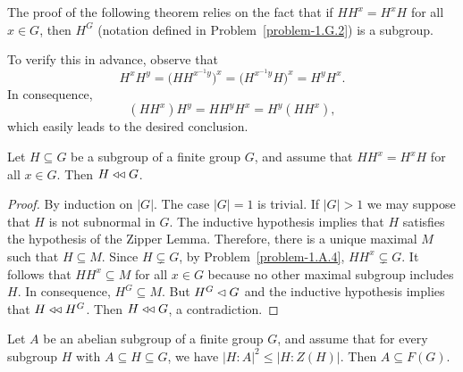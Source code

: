 \begin{rem}
    The proof of the following theorem relies on the fact that if $HH^x=H^xH$ for all $x\in G$, then $H^G$ (notation defined in {\upshape Problem~\ref{problem-1.G.2}}) is a subgroup.
    
    To verify this in advance, observe that
    $$
        H^xH^y = \Big(HH^{x^{-1}y}\Big)^x = \Big(H^{x^{-1}y}H\Big)^x = H^yH^x.
    $$
    In consequence,
    $$
        (HH^x)H^y = HH^yH^x = H^y(HH^x),
    $$
    which easily leads to the desired conclusion.
\end{rem}

\begin{thm}\label{conjugate-commutativity}
   Let\/ $H \subseteq G$ be a subgroup of a finite group\/ $G$, and assume that\/ $HH^x = H^xH$ for all\/ $x \in G$. Then $H \mathrel{\triangleleft\triangleleft} G$.
\end{thm}

\begin{proof} By induction on $|G|$. The case $|G|=1$ is trivial. If $|G|>1$ we may suppose that $H$ is not subnormal in $G$. The inductive hypothesis implies that $H$ satisfies the hypothesis of the Zipper Lemma. Therefore, there is a unique maximal $M$ such that $H\subseteq M$. Since $H\varsubsetneq G$, by Problem~\ref{problem-1.A.4}, $HH^x\varsubsetneq G$. It follows that $HH^x\subseteq M$ for all $x\in G$ because no other maximal subgroup includes $H$. In consequence, $H^G\subseteq M$. But $H^G\lhd G$ and the inductive hypothesis implies that $H\mathrel{\triangleleft\triangleleft} H^G$. Then $H\mathrel{\triangleleft\triangleleft} G$, a contradiction.  \end{proof}

\begin{thm}
    Let\/ $A$ be an abelian subgroup of a finite group\/ $G$, and assume that for every subgroup\/ $H$ with\/ $A \subseteq H \subseteq G$, we have\/ $|H:A|^2 \le |H:Z(H)|$. Then\/ $A \subseteq F(G)$.
\end{thm}

